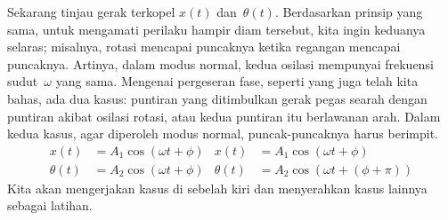 Sekarang tinjau gerak terkopel $x(t)$ dan~$\theta(t)$.
Berdasarkan prinsip yang sama, untuk mengamati perilaku hampir diam tersebut, kita ingin keduanya 
selaras; misalnya, rotasi mencapai
puncaknya ketika regangan mencapai puncaknya.
Artinya, dalam modus normal, kedua osilasi mempunyai
frekuensi sudut~$\omega$ yang sama.
Mengenai pergeseran fase, seperti yang juga telah kita bahas, ada dua
kasus: puntiran yang ditimbulkan gerak pegas searah
dengan puntiran akibat osilasi rotasi, atau kedua puntiran itu berlawanan arah.
Dalam kedua kasus, agar diperoleh modus normal, puncak-puncaknya harus berimpit.
\begin{align*}
  x(t) &= A_1\cos(\omega t+\phi)  
       &x(t) &= A_1\cos(\omega t+\phi)   \\  
  \theta(t) &= A_2\cos(\omega t+\phi)  
       &\theta(t) &= A_2\cos(\omega t+(\phi+\pi))    
\end{align*}
Kita akan mengerjakan kasus di sebelah kiri dan menyerahkan kasus lainnya sebagai latihan.

